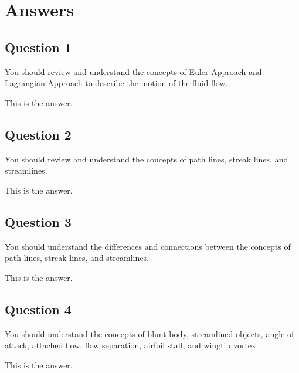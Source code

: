 \chapter{Answers}
\label{cp:answers}

\section{Question 1}
\begin{importantbox}
You should review and understand the concepts of Euler Approach and Lagrangian Approach to describe the motion of the fluid flow.
\end{importantbox}
\noindent{}This is the answer.

\section{Question 2}
\begin{importantbox}
You should review and understand the concepts of path lines, streak lines, and streamlines.
\end{importantbox}
\noindent{}This is the answer.

\section{Question 3}
\begin{importantbox}
You should understand the differences and connections between the concepts of path lines, streak lines, and streamlines.
\end{importantbox}
\noindent{}This is the answer.

\section{Question 4}
\begin{importantbox}
You should understand the concepts of blunt body, streamlined objects, angle of attack, attached flow, flow separation, airfoil stall, and wingtip vortex.
\end{importantbox}
\noindent{}This is the answer.